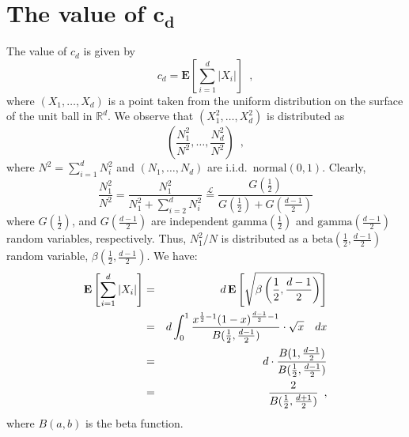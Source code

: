 \documentclass[charterfonts,lotsofwhite]{patmorin}
\newcommand{\E}{\mathbf{E}}
\begin{document}





\appendix
\section{The value of $\mathbf{c_d}$}

The value of $c_d$ is given by
\[
  c_d = \E \left[\sum_{i=1}^d|X_i| \right] \enspace ,
\]
where $(X_1,\ldots,X_d)$ is a point taken from the uniform
distribution on the surface of the unit ball in $\mathbb{R}^d$.
We observe that $(X_1^2,\ldots,X_d^2)$ is distributed as 
\[
\left(\frac{N_1^2}{N^2},\ldots,\frac{N_d^2}{N^2}\right) \enspace ,
\]
where $N^2=\sum_{i=1}^d N_i^2$ and $(N_1,\ldots,N_d)$ are i.i.d.\
$\mathrm{normal}(0,1)$.  Clearly,
\[
\frac{N_1^2}{N^2} = \frac{N_1^2}{N_1^2+\sum_{i=2}^dN_i^2}
  \stackrel{\mathcal{L}}{=} \frac{G(\frac{1}{2})}{G(\frac{1}{2})+G(\frac{d-1}{2})}
\]
where $G(\frac{1}{2})$, and $G(\frac{d-1}{2})$ are independent
$\mathrm{gamma}(\frac{1}{2})$ and $\mathrm{gamma}(\frac{d-1}{2})$
random variables, respectively.  Thus, $N_1^2/N$ is distributed as a
$\mathrm{beta}(\frac{1}{2},\frac{d-1}{2})$ random variable,
$\beta(\frac{1}{2},\frac{d-1}{2})$.  We have:
\begin{eqnarray*}
\E\left[\sum_{i=1}^d |X_i|\right]
 & = & d\,\E\left[\sqrt{\beta\left(\frac{1}{2},\frac{d-1}{2}\right)}\right] \\
 & = & d\int_0^1\frac{x^{\frac{1}{2}-1}(1-x)^{\frac{d-1}{2}-1}}
                    {B(\frac{1}{2},\frac{d-1}{2})}\cdot\sqrt{x} \quad dx\\
 & = & d\cdot\frac{B(1,\frac{d-1}{2})}{B(\frac{1}{2},\frac{d-1}{2})}\\
\comment{ & = & d\cdot 
       \frac{\Gamma(\frac{d-1}{2})}
            {\Gamma(\frac{d+1}{2})} \cdot
       \frac{\Gamma(\frac{d}{2})}
            {\Gamma(\frac{1}{2})\cdot\Gamma(\frac{d-1}{2})} \\
 & = & \frac{d\Gamma(\frac{d}{2})}
            {\Gamma(\frac{1}{2})\cdot\Gamma(\frac{d+1}{2})} \\ 
 & = & \frac{2\Gamma(\frac{d}{2}+1)}
            {\Gamma(\frac{1}{2})\cdot\Gamma(\frac{d+1}{2})} \\
}
 & = & \frac{2}{B(\frac{1}{2},\frac{d+1}{2})} \enspace , 
\end{eqnarray*}
where $B(a,b)$ is the beta function.
\end{document}
